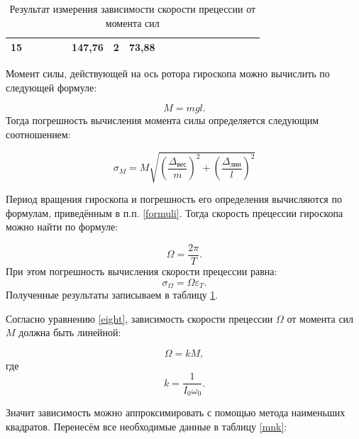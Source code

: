 \documentclass[a4paper,12pt]{article} %
\begin{document}
\begin{table}[H]
\begin{tabular}{|c|c|c|c|c|c|c|c|c|c|c|c|c|c|c|c|c|c|}
	15 &                        &                        &                        &                        & 147,76            & 2              & 73,88              &                        &                       &                        &                                           &                         \\ \hline
	\end{tabular}
	\caption{Результат измерения зависимости скорости прецессии от момента сил}
	\label{sk_pre}
\end{table}

Момент силы, действующей на ось ротора гироскопа можно вычислить по следующей формуле:

\begin{equation}
M = mgl.
\end{equation}
Тогда погрешность вычисления момента силы определяется следующим соотношением:

\begin{equation}
\sigma_M = M\sqrt{\left( \frac{\Delta_\text{вес}}{m} \right)^2 + \left( \frac{\Delta_\text{лин}}{l} \right)^2}
\end{equation}

Период вращения гироскопа и погрешность его определения вычисляются по формулам, приведённым в п.п. \ref{formuli}.
Тогда скорость прецессии гироскопа можно найти по формуле:

\begin{equation}
\Omega = \frac{2\pi}{T}.
\end{equation}
При этом погрешность вычисления скорости прецессии равна:
\begin{equation}
\sigma_\Omega = \Omega \varepsilon_T.
\end{equation}
Полученные результаты записываем в таблицу \ref{sk_pre}.

Согласно уравнению \eqref{eight}, зависимость скорости прецессии $ \Omega $ от момента сил $ M $ должна быть линейной:

\begin{equation}
\Omega = kM,
\end{equation}
где
\begin{equation}
k = \frac{1}{I_0\omega_0}.
\end{equation}

Значит зависимость можно аппроксимировать с помощью метода наименьших квадратов. Перенесём все необходимые данные в таблицу \ref{mnk}:
\end{document}

